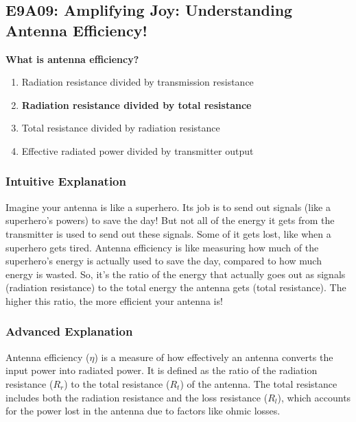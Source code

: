 \subsection{E9A09: Amplifying Joy: Understanding Antenna Efficiency!}

\begin{tcolorbox}[colback=gray!10!white,colframe=black!75!black,title=\textbf{Question E9A09}]
\textbf{What is antenna efficiency?}
\begin{enumerate}[label=\Alph*,noitemsep]
    \item Radiation resistance divided by transmission resistance
    \item \textbf{Radiation resistance divided by total resistance}
    \item Total resistance divided by radiation resistance
    \item Effective radiated power divided by transmitter output
\end{enumerate}
\end{tcolorbox}

\subsubsection{Intuitive Explanation}
Imagine your antenna is like a superhero. Its job is to send out signals (like a superhero's powers) to save the day! But not all of the energy it gets from the transmitter is used to send out these signals. Some of it gets lost, like when a superhero gets tired. Antenna efficiency is like measuring how much of the superhero's energy is actually used to save the day, compared to how much energy is wasted. So, it's the ratio of the energy that actually goes out as signals (radiation resistance) to the total energy the antenna gets (total resistance). The higher this ratio, the more efficient your antenna is!

\subsubsection{Advanced Explanation}
Antenna efficiency (\(\eta\)) is a measure of how effectively an antenna converts the input power into radiated power. It is defined as the ratio of the radiation resistance (\(R_r\)) to the total resistance (\(R_t\)) of the antenna. The total resistance includes both the radiation resistance and the loss resistance (\(R_l\)), which accounts for the power lost in the antenna due to factors like ohmic losses.

